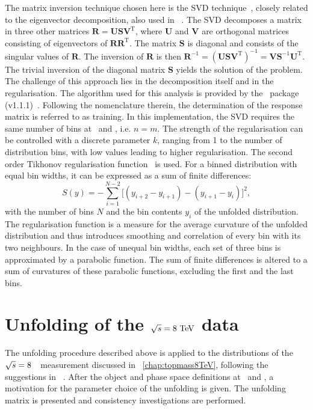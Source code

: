 The matrix inversion technique chosen here is the \gls{SVD} technique~\cite{Hocker:1995kb}, closely related to the eigenvector decomposition, also used in ~\cite{PhysRevD.90.072004,ATLAS:2014zza}.
%
The \gls{SVD} decomposes a matrix in three other matrices $\mathbf{R}=\mathbf{USV}^\mathrm{T}$, where $\mathbf{U}$  and $\mathbf{V}$ are orthogonal matrices consisting of eigenvectors of $\mathbf{R}\mathbf{R}^\mathrm{T}$. The matrix $\mathbf{S}$ is diagonal and consists of the singular values of $\mathbf{R}$. The inversion of $\mathbf{R}$ is then $\mathbf{R}^{-1}=(\mathbf{USV}^\mathrm{T})^{-1}=\mathbf{VS}^{-1}\mathbf{U}^\mathrm{T}$. The trivial inversion of the diagonal matrix $\mathbf{S}$ yields the solution of the problem. 
%
The challenge of this approach lies in the decomposition itself and in the regularisation. 
%
The algorithm used for this analysis is provided by the \Roounfold\ package (v1.1.1)~\cite{Prosper:1306523}. Following the nomenclature therein, the determination of the response matrix is referred to as training.
%
In this implementation, the \gls{SVD} requires the same number of bins at \recol\ and \truelevel, i.e. $n=m$. The strength of the regularisation can be controlled with a discrete parameter $k$, ranging from 1 to the number of distribution bins, with low values leading to higher regularisation. The second order Tikhonov regularisation function~\cite{levine1979} is used. 
%
For a binned distribution with equal bin widths, it can be expressed as a sum of finite differences:
\[
S(y)=-\sum_{i=1}^{N-2}\big[(y_{i+2}-y_{i+1})-(y_{i+1}-y_{i})\big]^2,
\]
with the number of bins $N$ and the bin contents $y_i$ of the unfolded distribution. 
%
The regularisation function is a measure for the average curvature of the unfolded distribution and thus introduces smoothing and correlation of every bin with its two neighbours.
%
In the case of unequal bin widths, each set of three bins is approximated by a parabolic function. The sum of finite differences is altered to a sum of curvatures of these parabolic functions, excluding the first and the last bins.











\section[Unfolding of the $\sqrts=8$~\TeV\ data]{Unfolding of the \boldmath${\sqrt{s}}=8~\mathrm{TeV}$ data}
%
The unfolding procedure described above is applied to the distributions of the $\sqrts=8$~\TeV\ measurement discussed in \chap~\ref{chap:topmass8TeV}, following the suggestions in ~\cite{Armbruster:1694351}.
%
After the object and phase space definitions at \recol\ and \truelevel, a motivation for the parameter choice of the unfolding is given. The unfolding matrix is presented and consistency investigations are performed.






